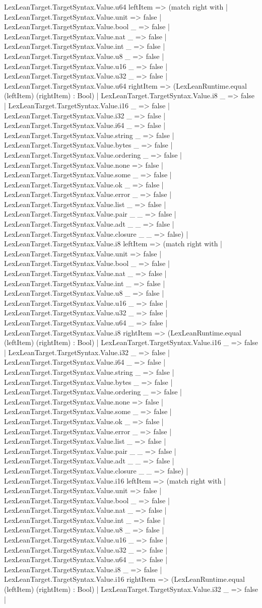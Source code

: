 \documentclass[11pt]{article}
\begin{document}
LexLeanTarget.TargetSyntax.Value.u64 leftItem => (match right with | LexLeanTarget.TargetSyntax.Value.unit => false | LexLeanTarget.TargetSyntax.Value.bool \_ => false | LexLeanTarget.TargetSyntax.Value.nat \_ => false | LexLeanTarget.TargetSyntax.Value.int \_ => false | LexLeanTarget.TargetSyntax.Value.u8 \_ => false | LexLeanTarget.TargetSyntax.Value.u16 \_ => false | LexLeanTarget.TargetSyntax.Value.u32 \_ => false | LexLeanTarget.TargetSyntax.Value.u64 rightItem => (LexLeanRuntime.equal (leftItem) (rightItem) : Bool) | LexLeanTarget.TargetSyntax.Value.i8 \_ => false | LexLeanTarget.TargetSyntax.Value.i16 \_ => false | LexLeanTarget.TargetSyntax.Value.i32 \_ => false | LexLeanTarget.TargetSyntax.Value.i64 \_ => false | LexLeanTarget.TargetSyntax.Value.string \_ => false | LexLeanTarget.TargetSyntax.Value.bytes \_ => false | LexLeanTarget.TargetSyntax.Value.ordering \_ => false | LexLeanTarget.TargetSyntax.Value.none => false | LexLeanTarget.TargetSyntax.Value.some \_ => false | LexLeanTarget.TargetSyntax.Value.ok \_ => false | LexLeanTarget.TargetSyntax.Value.error \_ => false | LexLeanTarget.TargetSyntax.Value.list \_ => false | LexLeanTarget.TargetSyntax.Value.pair \_ \_ => false | LexLeanTarget.TargetSyntax.Value.adt \_ \_ => false | LexLeanTarget.TargetSyntax.Value.closure \_ \_ => false) | LexLeanTarget.TargetSyntax.Value.i8 leftItem => (match right with | LexLeanTarget.TargetSyntax.Value.unit => false | LexLeanTarget.TargetSyntax.Value.bool \_ => false | LexLeanTarget.TargetSyntax.Value.nat \_ => false | LexLeanTarget.TargetSyntax.Value.int \_ => false | LexLeanTarget.TargetSyntax.Value.u8 \_ => false | LexLeanTarget.TargetSyntax.Value.u16 \_ => false | LexLeanTarget.TargetSyntax.Value.u32 \_ => false | LexLeanTarget.TargetSyntax.Value.u64 \_ => false | LexLeanTarget.TargetSyntax.Value.i8 rightItem => (LexLeanRuntime.equal (leftItem) (rightItem) : Bool) | LexLeanTarget.TargetSyntax.Value.i16 \_ => false | LexLeanTarget.TargetSyntax.Value.i32 \_ => false | LexLeanTarget.TargetSyntax.Value.i64 \_ => false | LexLeanTarget.TargetSyntax.Value.string \_ => false | LexLeanTarget.TargetSyntax.Value.bytes \_ => false | LexLeanTarget.TargetSyntax.Value.ordering \_ => false | LexLeanTarget.TargetSyntax.Value.none => false | LexLeanTarget.TargetSyntax.Value.some \_ => false | LexLeanTarget.TargetSyntax.Value.ok \_ => false | LexLeanTarget.TargetSyntax.Value.error \_ => false | LexLeanTarget.TargetSyntax.Value.list \_ => false | LexLeanTarget.TargetSyntax.Value.pair \_ \_ => false | LexLeanTarget.TargetSyntax.Value.adt \_ \_ => false | LexLeanTarget.TargetSyntax.Value.closure \_ \_ => false) | LexLeanTarget.TargetSyntax.Value.i16 leftItem => (match right with | LexLeanTarget.TargetSyntax.Value.unit => false | LexLeanTarget.TargetSyntax.Value.bool \_ => false | LexLeanTarget.TargetSyntax.Value.nat \_ => false | LexLeanTarget.TargetSyntax.Value.int \_ => false | LexLeanTarget.TargetSyntax.Value.u8 \_ => false | LexLeanTarget.TargetSyntax.Value.u16 \_ => false | LexLeanTarget.TargetSyntax.Value.u32 \_ => false | LexLeanTarget.TargetSyntax.Value.u64 \_ => false | LexLeanTarget.TargetSyntax.Value.i8 \_ => false | LexLeanTarget.TargetSyntax.Value.i16 rightItem => (LexLeanRuntime.equal (leftItem) (rightItem) : Bool) | LexLeanTarget.TargetSyntax.Value.i32 \_ => false | 
\end{document}
